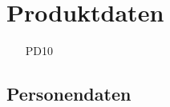 \documentclass[a4paper,12pt]{article}
\begin{document}









\section{Produktdaten}
\begin{itemize}[nosep]
\item[PD10]
\end{itemize}














\subsection{Personendaten}
\end{document}
